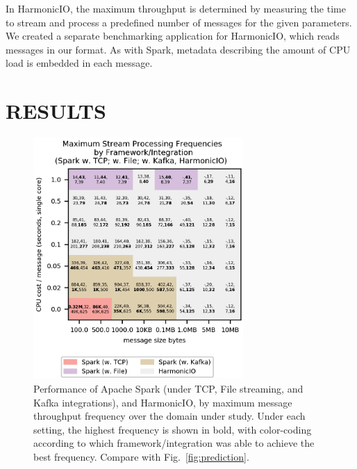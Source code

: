 \documentclass[conference]{IEEEtran}
\begin{document}
In HarmonicIO, the maximum throughput is determined by measuring the time to stream and process a predefined number of messages for the given parameters.
We created a separate benchmarking application for HarmonicIO, which reads messages in our format. As with Spark, metadata describing the amount of CPU load is embedded in each message.






\section{RESULTS}\label{results}

\begin{figure}[h]
\begin{center}
\includegraphics[width=8cm]{images/best-w-freqs-cropped.png}
\end{center}
\caption{Performance of Apache Spark (under TCP, File streaming, and Kafka integrations), and HarmonicIO, by maximum message throughput frequency over the domain under study. Under each setting, the highest frequency is shown in bold, with color-coding according to which framework/integration was able to achieve the best frequency. Compare with Fig.~\ref{fig:prediction}.}
\label{fig:blobs}
\end{figure}
\end{document}
